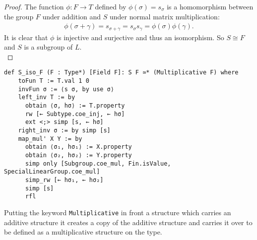 \begin{proof}
\leanok
     The function $\phi: F \rightarrow T$ defined by $\phi(\sigma) = s_\sigma$ is a homomorphism between the group $F$ under addition and $S$ under normal matrix multiplication:
\begin{align*} \phi(\sigma + \gamma) = s_{\sigma + \gamma} = s_\sigma s_\gamma = \phi(\sigma) \phi(\gamma).
\end{align*}
It is clear that $\phi$ is injective and surjective and thus an isomorphism. So $ S \cong F$ and $S$ is a subgroup of $L$. \\
\end{proof}
\begin{footnotesize}
\begin{verbatim}
def S_iso_F (F : Type*) [Field F]: S F ≃* (Multiplicative F) where
    toFun T := T.val 1 0
    invFun σ := ⟨s σ, by use σ⟩
    left_inv T := by
      obtain ⟨σ, hσ⟩ := T.property
      rw [← Subtype.coe_inj, ← hσ]
      ext <;> simp [s, ← hσ]
    right_inv σ := by simp [s]
    map_mul' X Y := by
      obtain ⟨σ₁, hσ₁⟩ := X.property
      obtain ⟨σ₂, hσ₂⟩ := Y.property
      simp only [Subgroup.coe_mul, Fin.isValue, SpecialLinearGroup.coe_mul]
      simp_rw [← hσ₁, ← hσ₂]
      simp [s]
      rfl
\end{verbatim}
\end{footnotesize}

\begin{remark}[Multiplicative]
    Putting the keyword \texttt{Multiplicative} in front a structure which carries an additive structure
    it creates a copy of the additive structure and carries it over to be defined as a multiplicative structure
    on the type. 
\end{remark}


